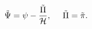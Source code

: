 \begin{equation}
\tilde{\Psi} = \psi - \frac{\tilde{\Pi}}{\cal H},~~~~\tilde{\Pi} = \tilde{\pi}.
\end{equation}

